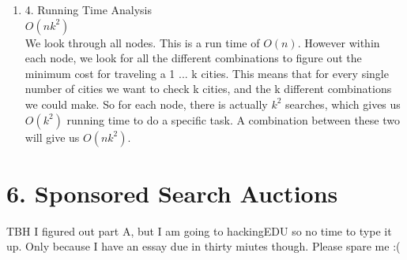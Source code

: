 \documentclass[11pt]{article}
\newenvironment{qparts}{\begin{enumerate}[{(}a{)}]}{\end{enumerate}}
\begin{document}
\begin{qparts}
So if we run this algorithm and complete it, the root node should have the all the minimal cost to traverse all numbers of cities from 1 to k cities. As a result, we can call on the kth city, and have it return the value. 

\item[4.] Running Time Analysis \\
$O(nk^{2})$ \\

We look through all nodes. This is a run time of $O(n)$. However within each node, we look for all the different combinations to figure out the minimum cost for traveling a 1 ... k cities. This means that for every single number of cities we want to check k cities, and the k different combinations we could make. So for each node, there is actually $k^2$ searches, which gives us $O(k^2)$ running time to do a specific task. A combination between these two will give us $O(nk^2)$. 
\end{qparts}

\newpage
\section*{6. Sponsored Search Auctions}
TBH I figured out part A, but I am going to hackingEDU so no time to type it up. Only because I have an essay due in thirty miutes though. Please spare me :(
\end{document}
